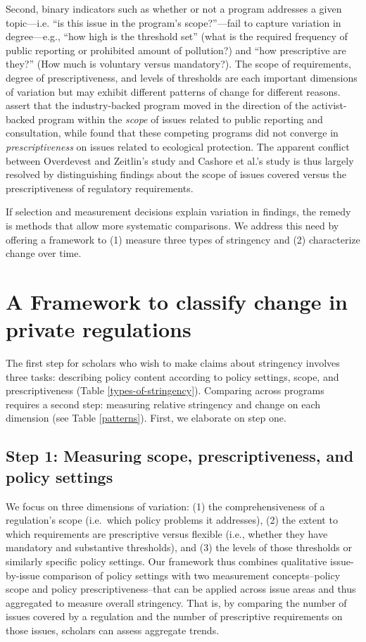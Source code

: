 \documentclass[
      12pt,
            Review ]{article}
\begin{document}
Second, binary indicators such as whether or not a program addresses a
given topic---i.e. ``is this issue in the program's scope?''---fail to
capture variation in degree---e.g., ``how high is the threshold set''
(what is the required frequency of public reporting or prohibited amount
of pollution?) and ``how prescriptive are they?'' (How much is voluntary
versus mandatory?). The scope of requirements, degree of
prescriptiveness, and levels of thresholds are each important dimensions
of variation but may exhibit different patterns of change for different
reasons. \citet{Overdevest2014} assert that the industry-backed program
moved in the direction of the activist-backed program within the
\emph{scope} of issues related to public reporting and consultation,
while \citet{Cashore2004} found that these competing programs did not
converge in \emph{prescriptiveness} on issues related to ecological
protection. The apparent conflict between Overdevest and Zeitlin's study
and Cashore et al.'s study is thus largely resolved by distinguishing
findings about the scope of issues covered versus the prescriptiveness
of regulatory requirements.

If selection and measurement decisions explain variation in findings,
the remedy is methods that allow more systematic comparisons. We address
this need by offering a framework to (1) measure three types of
stringency and (2) characterize change over time.

\section{A Framework to classify change in private
regulations}\label{a-framework-to-classify-change-in-private-regulations}

The first step for scholars who wish to make claims about stringency
involves three tasks: describing policy content according to policy
settings, scope, and prescriptiveness (Table \ref{types-of-stringency}).
Comparing across programs requires a second step: measuring relative
stringency and change on each dimension (see Table \ref{patterns}).
First, we elaborate on step one.

\subsection{Step 1: Measuring scope, prescriptiveness, and policy
settings}\label{step-1-measuring-scope-prescriptiveness-and-policy-settings}

We focus on three dimensions of variation: (1) the comprehensiveness of
a regulation's scope (i.e.~which policy problems it addresses), (2) the
extent to which requirements are prescriptive versus flexible (i.e.,
whether they have mandatory and substantive thresholds), and (3) the
levels of those thresholds or similarly specific policy settings. Our
framework thus combines qualitative issue-by-issue comparison of policy
settings with two measurement concepts--policy scope and policy
prescriptiveness--that can be applied across issue areas and thus
aggregated to measure overall stringency. That is, by comparing the
number of issues covered by a regulation and the number of prescriptive
requirements on those issues, scholars can assess aggregate trends.
\end{document}
